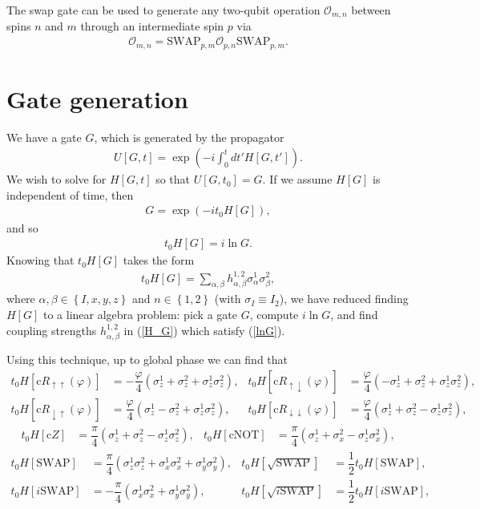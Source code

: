\documentclass[11pt]{article}
\renewcommand{\t}{\text} %
\newcommand{\f}[2]{\dfrac{#1}{#2}} %
\newcommand{\p}[1]{\left(#1\right)} %
\renewcommand{\sp}[1]{\left[#1\right]} %
\renewcommand{\set}[1]{\left\{#1\right\}} %
\renewcommand{\d}{\partial} %
\renewcommand{\phi}{\varphi} %
\renewcommand{\u}{\uparrow}
\renewcommand{\d}{\downarrow}
\begin{document}
The swap gate can be used to generate any two-qubit operation
$\mathcal O_{m,n}$ between spins $n$ and $m$ through an intermediate
spin $p$ via
\begin{align}
  \mathcal O_{m,n}=\t{SWAP}_{p,m}\mathcal O_{p,n}\t{SWAP}_{p,m}.
\end{align}

\newpage
\section*{Gate generation}

We have a gate $G$, which is generated by the propagator
\begin{align}
  U\sp{G,t}=\exp\p{-i\int_0^tdt'H\sp{G,t'}}.
\end{align}
We wish to solve for $H\sp{G,t}$ so that $U\sp{G,t_0}=G$. If we assume
$H\sp{G}$ is independent of time, then
\begin{align}
  G=\exp\p{-it_0H\sp{G}},
\end{align}
and so
\begin{align}
  t_0H\sp{G}=i\ln G. \label{lnG}
\end{align}
Knowing that $t_0H\sp{G}$ takes the form
\begin{align}
  t_0H\sp{G}
  =\sum_{\alpha,\beta}h_{\alpha,\beta}^{1,2}\sigma_\alpha^1\sigma_\beta^2,
  \label{H_G}
\end{align}
where $\alpha,\beta\in\set{I,x,y,z}$ and $n\in\set{1,2}$ (with
$\sigma_I\equiv I_2$), we have reduced finding $H\sp{G}$ to a linear
algebra problem: pick a gate $G$, compute $i\ln G$, and find coupling
strengths $h_{\alpha,\beta}^{1,2}$ in (\ref{H_G}) which satisfy
(\ref{lnG}).

Using this technique, up to global phase we can find that
\begin{align}
  t_0H\sp{\t{c}R_{\u\u}\p\phi}&=-\f\phi4\p{\sigma_z^1+\sigma_z^2
    +\sigma_z^1\sigma_z^2}, &
  t_0H\sp{\t{c}R_{\u\d}\p\phi}&=\f\phi4\p{-\sigma_z^1+\sigma_z^2
    +\sigma_z^1\sigma_z^2}, \\
  t_0H\sp{\t{c}R_{\d\u}\p\phi}&=\f\phi4\p{\sigma_z^1-\sigma_z^2
    +\sigma_z^1\sigma_z^2}, & t_0H\sp{\t{c}R_{\d\d}\p\phi}
  &=\f\phi4\p{\sigma_z^1+\sigma_z^2 -\sigma_z^1\sigma_z^2},
\end{align}
\begin{align}
  t_0H\sp{\t{c}Z}
  &=\f\pi4\p{\sigma_z^1+\sigma_z^2-\sigma_z^1\sigma_z^2}, &
  t_0H\sp{\t{cNOT}}
  &=\f\pi4\p{\sigma_z^1+\sigma_x^2-\sigma_z^1\sigma_x^2},
\end{align}
\begin{align}
  t_0H\sp{\t{SWAP}}&=\f\pi4\p{\sigma_z^1\sigma_z^2
    +\sigma_x^1\sigma_x^2+\sigma_y^1\sigma_y^2}, &
  t_0H\sp{\sqrt{\t{SWAP}}}&=\f12t_0H\sp{\t{SWAP}}, \\
  t_0H\sp{i\t{SWAP}}&=-\f\pi4\p{\sigma_x^1\sigma_x^2
    +\sigma_y^1\sigma_y^2}, &
  t_0H\sp{\sqrt{i\t{SWAP}}}&=\f12t_0H\sp{i\t{SWAP}},
\end{align}
\end{document}
